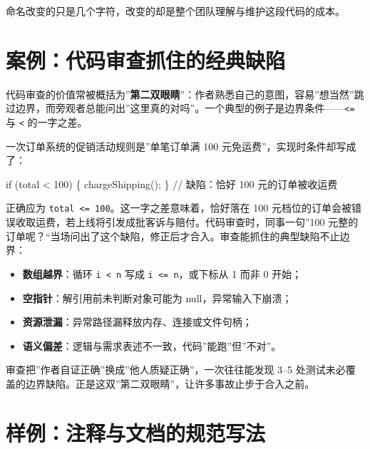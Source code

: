 \documentclass[12pt,a4paper,twoside,openany]{ctexbook}
\numberwithin{figure}{chapter}
\numberwithin{table}{chapter}
\newenvironment{Shaded}{}{}
\newcommand{\NormalTok}[1]{#1}
\providecommand{\tightlist}{\setlength{\itemsep}{0pt}\setlength{\parskip}{0pt}}
\begin{document}
命名改变的只是几个字符，改变的却是整个团队理解与维护这段代码的成本。

\section{案例：代码审查抓住的经典缺陷}\label{ux6848ux4f8bux4ee3ux7801ux5ba1ux67e5ux6293ux4f4fux7684ux7ecfux5178ux7f3aux9677}

代码审查的价值常被概括为''\textbf{第二双眼睛}''：作者熟悉自己的意图，容易''想当然''跳过边界，而旁观者总能问出''这里真的对吗''。一个典型的例子是边界条件------\texttt{\textless{}=}
与 \texttt{\textless{}} 的一字之差。

一次订单系统的促销活动规则是''单笔订单满 100
元免运费''，实现时条件却写成了：

\begin{Shaded}
\begin{Highlighting}[]
\NormalTok{if (total \textless{} 100) \{ chargeShipping(); \}   // 缺陷：恰好 100 元的订单被收运费}
\end{Highlighting}
\end{Shaded}

正确应为 \texttt{total\ \textless{}=\ 100}。这一字之差意味着，恰好落在
100
元档位的订单会被错误收取运费，若上线将引发成批客诉与赔付。代码审查时，同事一句''100
元整的订单呢？``当场问出了这个缺陷，修正后才合入。审查能抓住的典型缺陷不止边界：

\begin{itemize}
\tightlist
\item
  \textbf{数组越界}：循环 \texttt{i\ \textless{}\ n} 写成
  \texttt{i\ \textless{}=\ n}，或下标从 1 而非 0 开始；
\item
  \textbf{空指针}：解引用前未判断对象可能为 null，异常输入下崩溃；
\item
  \textbf{资源泄漏}：异常路径漏释放内存、连接或文件句柄；
\item
  \textbf{语义偏差}：逻辑与需求表述不一致，代码''能跑''但''不对''。
\end{itemize}

审查把''作者自证正确''换成''他人质疑正确''，一次往往能发现 3--5
处测试未必覆盖的边界缺陷。正是这双''第二双眼睛''，让许多事故止步于合入之前。

\section{样例：注释与文档的规范写法}\label{ux6837ux4f8bux6ce8ux91caux4e0eux6587ux6863ux7684ux89c4ux8303ux5199ux6cd5}
\end{document}
